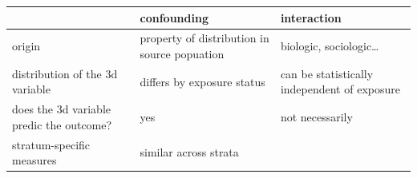 \documentclass[
]{article}
\begin{document}
\begin{longtable}[]{@{}lll@{}}
\toprule
\begin{minipage}[b]{0.24\columnwidth}\raggedright
\strut
\end{minipage} & \begin{minipage}[b]{0.42\columnwidth}\raggedright
confounding\strut
\end{minipage} & \begin{minipage}[b]{0.26\columnwidth}\raggedright
interaction\strut
\end{minipage}\tabularnewline
\midrule
\endhead
\begin{minipage}[t]{0.24\columnwidth}\raggedright
origin\strut
\end{minipage} & \begin{minipage}[t]{0.42\columnwidth}\raggedright
property of distribution in source popuation\strut
\end{minipage} & \begin{minipage}[t]{0.26\columnwidth}\raggedright
biologic, sociologic\ldots{}\strut
\end{minipage}\tabularnewline
\begin{minipage}[t]{0.24\columnwidth}\raggedright
distribution of the 3d variable\strut
\end{minipage} & \begin{minipage}[t]{0.42\columnwidth}\raggedright
differs by exposure status\strut
\end{minipage} & \begin{minipage}[t]{0.26\columnwidth}\raggedright
can be statistically independent of exposure\strut
\end{minipage}\tabularnewline
\begin{minipage}[t]{0.24\columnwidth}\raggedright
does the 3d variable predic the outcome?\strut
\end{minipage} & \begin{minipage}[t]{0.42\columnwidth}\raggedright
yes\strut
\end{minipage} & \begin{minipage}[t]{0.26\columnwidth}\raggedright
not necessarily\strut
\end{minipage}\tabularnewline
\begin{minipage}[t]{0.24\columnwidth}\raggedright
stratum-specific measures\strut
\end{minipage} & \begin{minipage}[t]{0.42\columnwidth}\raggedright
similar across strata\strut
\end{minipage} & \begin{minipage}[t]{0.26\columnwidth}\raggedright

\end{minipage}
\end{longtable}
\end{document}
